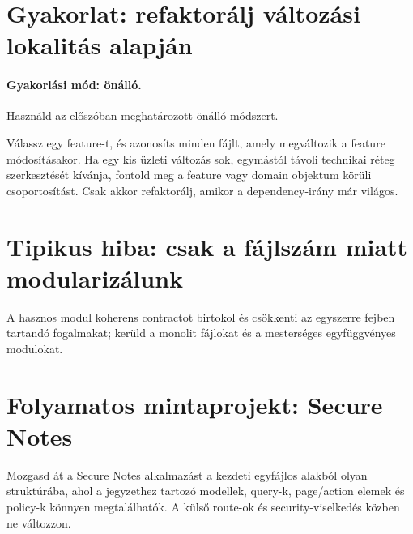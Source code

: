 \section{Gyakorlat: refaktorálj változási lokalitás alapján}
\paragraph{Gyakorlási mód: önálló.} Használd az előszóban meghatározott önálló módszert.

Válassz egy feature-t, és azonosíts minden fájlt, amely megváltozik a feature módosításakor. Ha egy kis üzleti változás sok, egymástól távoli technikai réteg szerkesztését kívánja, fontold meg a feature vagy domain objektum körüli csoportosítást. Csak akkor refaktorálj, amikor a dependency-irány már világos.

\section{Tipikus hiba: csak a fájlszám miatt modularizálunk}
A hasznos modul koherens contractot birtokol és csökkenti az egyszerre fejben tartandó fogalmakat; kerüld a monolit fájlokat és a mesterséges egyfüggvényes modulokat.

\section{Folyamatos mintaprojekt: Secure Notes}
Mozgasd át a Secure Notes alkalmazást a kezdeti egyfájlos alakból olyan struktúrába, ahol a jegyzethez tartozó modellek, query-k, page/action elemek és policy-k könnyen megtalálhatók. A külső route-ok és security-viselkedés közben ne változzon.
